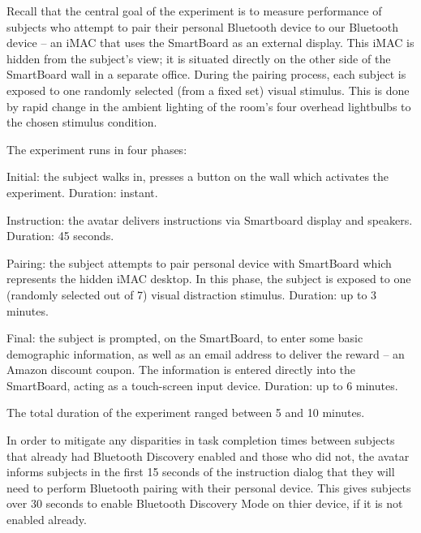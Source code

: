 \documentclass{llncs}
\begin{document}
Recall that the central goal of the experiment is to measure performance of subjects who attempt to 
pair their personal Bluetooth device to our Bluetooth device -- an iMAC that uses the SmartBoard 
as an external display. This iMAC is hidden from the subject's view; it is situated directly on the 
other side of the SmartBoard wall in a separate office. During the pairing process, each subject 
is exposed to one randomly selected (from a fixed set) visual stimulus.  This is done by rapid 
change in the ambient lighting of the room's four overhead lightbulbs to the 
chosen stimulus condition.

The experiment runs in four phases: 
\begin{compactenum}
\item Initial: the subject walks in, presses a button on the wall which activates the experiment. 
Duration: instant.
\item Instruction: the avatar delivers instructions via Smartboard display and speakers. 
Duration: 45 seconds.
\item Pairing: the subject attempts to pair personal device with SmartBoard which represents
the hidden iMAC desktop. In this phase, the subject is exposed to one (randomly selected out of 7) 
visual distraction stimulus. Duration: up to 3 minutes.
\item Final: the subject is prompted, on the SmartBoard, to enter some basic demographic 
information, as well as an email address to deliver the reward -- an Amazon discount coupon. 
The information is entered directly into the SmartBoard, acting as a touch-screen input device. 
Duration: up to 6 minutes.
\end{compactenum}
%
The total duration of the experiment ranged between 5 and 10 minutes.

In order to mitigate any disparities in task completion times between subjects that already had Bluetooth Discovery enabled and those who did not, the avatar informs subjects in the first 15 seconds of the instruction dialog that they will need to perform Bluetooth pairing with their personal device. This gives subjects over 30 seconds to enable Bluetooth Discovery Mode on thier device, if it is not enabled already.
\end{document}
